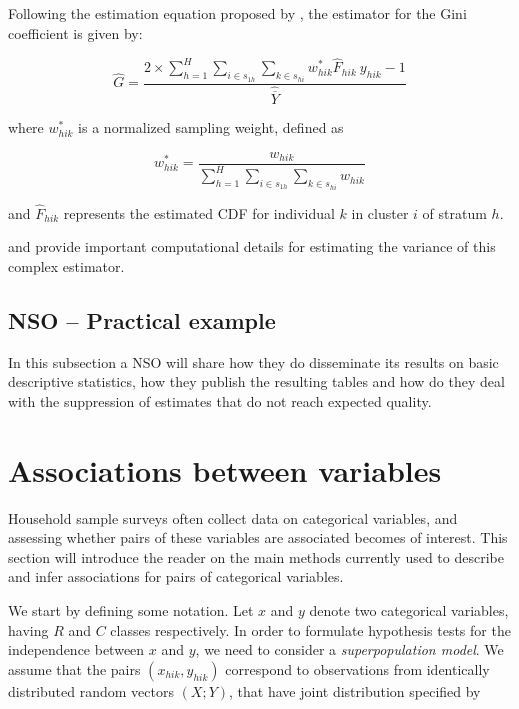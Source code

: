 \documentclass[
  12pt,
]{book}
\begin{document}
Following the estimation equation proposed by \citet{binder1995estimating}, the estimator for the Gini coefficient is given by:

\[
\widehat{G} = \frac {2 \times \sum_{h=1}^{H} \sum_{i \in s_{1h}} \sum_{k \in s_{hi}}  w_{hik}^{*} \widehat{F}_{hik} \ y_{hik} - 1} {\widehat{\overline{Y}}}
\]

where \(w_{hik}^{*}\) is a normalized sampling weight, defined as

\[
w_{hik}^{*} = \frac{w_{hik}} {\sum_{h=1}^{H} \sum_{i \in s_{1h}}  \sum_{k \in s_{hi}} w_{hik}}
\]

and \(\widehat{F}_{hik}\) represents the estimated CDF for individual \(k\) in cluster \(i\) of stratum \(h\).

\citet{osier2009variance} and \citet{Langel_Tille_2013} provide important computational details for estimating the variance of this complex estimator.

\section{NSO -- Practical example}\label{nso-practical-example}

In this subsection a NSO will share how they do disseminate its results on basic descriptive statistics, how they publish the resulting tables and how do they deal with the suppression of estimates that do not reach expected quality.

\chapter{Associations between variables}\label{associations-between-variables}

Household sample surveys often collect data on categorical variables, and assessing whether pairs of these variables are associated becomes of interest. This section will introduce the reader on the main methods currently used to describe and infer associations for pairs of categorical variables.

We start by defining some notation. Let \(x\) and \(y\) denote two categorical variables, having \(R\) and \(C\) classes respectively. In order to formulate hypothesis tests for the independence between \(x\) and \(y\), we need to consider a \emph{superpopulation model}. We assume that the pairs \((x_{hik} , y_{hik})\) correspond to observations from identically distributed random vectors \((X ; Y)\), that have joint distribution specified by
\end{document}
